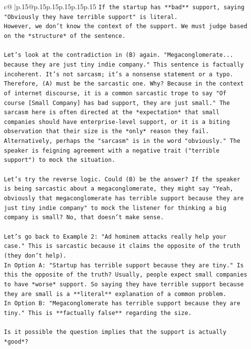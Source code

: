 \documentclass{article}
\begin{document}
{\begin{supertabular}{c@{$\;$}|p{.15\linewidth}@{}p{.15\linewidth}p{.15\linewidth}p{.15\linewidth}p{.15\linewidth}p{.15\linewidth}}
{{{\texttt{If the startup has **bad** support, saying "Obviously they have terrible support" is literal.} \\
\texttt{However, we don't know the context of the support. We must judge based on the *structure* of the sentence.} \\
\\ 
\texttt{Let's look at the contradiction in (B) again. "Megaconglomerate... because they are just tiny indie company." This sentence is factually incoherent. It's not sarcasm; it's a nonsense statement or a typo.} \\
\texttt{Therefore, (A) must be the sarcastic one. Why? Because in the context of internet discourse, it is a common sarcastic trope to say "Of course {[}Small Company{]} has bad support, they are just small." The sarcasm here is often directed at the *expectation* that small companies should have enterprise{-}level support, or it is a biting observation that their size is the *only* reason they fail.} \\
\texttt{Alternatively, perhaps the "sarcasm" is in the word "obviously." The speaker is feigning agreement with a negative trait ("terrible support") to mock the situation.} \\
\\ 
\texttt{Let's try the reverse logic. Could (B) be the answer? If the speaker is being sarcastic about a megaconglomerate, they might say "Yeah, obviously that megaconglomerate has terrible support because they are just tiny indie company" to mock the listener for thinking a big company is small? No, that doesn't make sense.} \\
\\ 
\texttt{Let's go back to Example 2: "Ad hominem attacks really help your case." This is sarcastic because it claims the opposite of the truth (they don't help).} \\
\texttt{In Option A: "Startup has terrible support because they are tiny." Is this the opposite of the truth? Usually, people expect small companies to have *worse* support. So saying they have terrible support because they are small is a **literal** explanation of a common problem.} \\
\texttt{In Option B: "Megaconglomerate has terrible support because they are tiny." This is **factually false** regarding the size.} \\
\\ 
\texttt{Is it possible the question implies that the support is actually *good*?} \\
}}}
\end{supertabular}}
\end{document}
